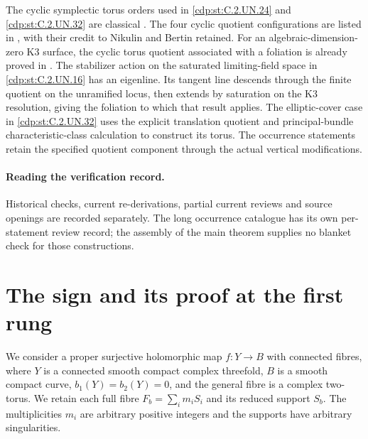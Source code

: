 The cyclic symplectic torus orders used in
\ref{cdp:st:C.2.UN.24} and \ref{cdp:st:C.2.UN.32}
are classical \cite[Lemmas~3.2--3.3, pp.~30--31]{Fujiki1988Tori}.
The four cyclic quotient configurations are listed in
\cite[table on p.~7659; Theorem~27, p.~7663]{Roulleau2019Kummer},
with their credit to Nikulin and Bertin retained.
For an algebraic-dimension-zero K3 surface, the cyclic
torus quotient associated with a foliation is already proved in
\cite[Section~10, pp.~29--30]{Brunella2002Foliations}.
The stabilizer action on the saturated limiting-field space
in \ref{cdp:st:C.2.UN.16} has an eigenline.  Its tangent line
descends through the finite quotient on the unramified locus,
then extends by saturation on the K3 resolution, giving the
foliation to which that result applies.  The elliptic-cover
case in \ref{cdp:st:C.2.UN.32} uses the explicit translation
quotient and principal-bundle characteristic-class calculation
to construct its torus.  The occurrence statements retain the
specified quotient component through the actual vertical
modifications.

\paragraph{Reading the verification record.}
Historical checks, current re-derivations, partial current
reviews and source openings are recorded separately. The long
occurrence catalogue has its own per-statement review record;
the assembly of the main theorem supplies no blanket check for
those constructions.

\section*{The sign and its proof at the first rung}
We consider a proper surjective holomorphic map
$f:Y\to B$ with connected fibres, where $Y$ is a connected
smooth compact complex threefold, $B$ is a smooth compact curve,
$b_1(Y)=b_2(Y)=0$, and the general fibre is a complex two-torus.
We retain each full fibre $F_b=\sum_i m_iS_i$ and its
reduced support $S_b$.  The multiplicities $m_i$ are arbitrary
positive integers and the supports have arbitrary singularities.


